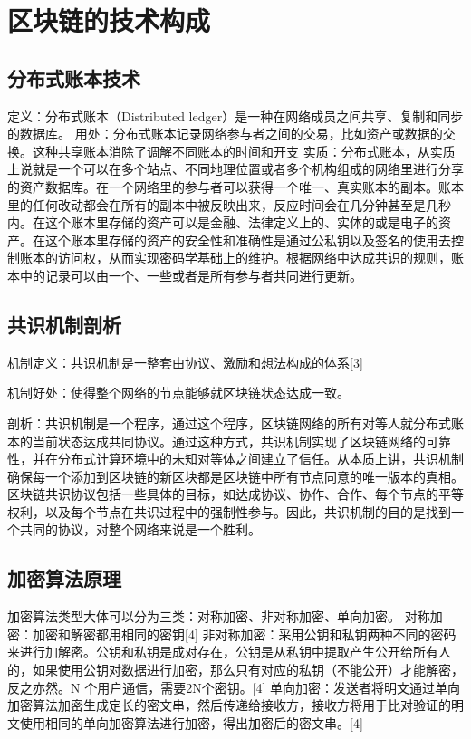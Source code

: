 
\chapter{区块链的技术构成}

\section{分布式账本技术}

定义：分布式账本（Distributed ledger）是一种在网络成员之间共享、复制和同步的数据库。
用处：分布式账本记录网络参与者之间的交易，比如资产或数据的交换。这种共享账本消除了调解不同账本的时间和开支 
实质：分布式账本，从实质上说就是一个可以在多个站点、不同地理位置或者多个机构组成的网络里进行分享的资产数据库。在一个网络里的参与者可以获得一个唯一、真实账本的副本。账本里的任何改动都会在所有的副本中被反映出来，反应时间会在几分钟甚至是几秒内。在这个账本里存储的资产可以是金融、法律定义上的、实体的或是电子的资产。在这个账本里存储的资产的安全性和准确性是通过公私钥以及签名的使用去控制账本的访问权，从而实现密码学基础上的维护。根据网络中达成共识的规则，账本中的记录可以由一个、一些或者是所有参与者共同进行更新。


\section{共识机制剖析}

机制定义：共识机制是一整套由协议、激励和想法构成的体系[3]

机制好处：使得整个网络的节点能够就区块链状态达成一致。

剖析：共识机制是一个程序，通过这个程序，区块链网络的所有对等人就分布式账本的当前状态达成共同协议。通过这种方式，共识机制实现了区块链网络的可靠性，并在分布式计算环境中的未知对等体之间建立了信任。从本质上讲，共识机制确保每一个添加到区块链的新区块都是区块链中所有节点同意的唯一版本的真相。区块链共识协议包括一些具体的目标，如达成协议、协作、合作、每个节点的平等权利，以及每个节点在共识过程中的强制性参与。因此，共识机制的目的是找到一个共同的协议，对整个网络来说是一个胜利。

\section{加密算法原理}

加密算法类型大体可以分为三类：对称加密、非对称加密、单向加密。
对称加密：加密和解密都用相同的密钥[4]
非对称加密：采用公钥和私钥两种不同的密码来进行加解密。公钥和私钥是成对存在，公钥是从私钥中提取产生公开给所有人的，如果使用公钥对数据进行加密，那么只有对应的私钥（不能公开）才能解密，反之亦然。N 个用户通信，需要2N个密钥。[4]
单向加密：发送者将明文通过单向加密算法加密生成定长的密文串，然后传递给接收方，接收方将用于比对验证的明文使用相同的单向加密算法进行加密，得出加密后的密文串。[4]


